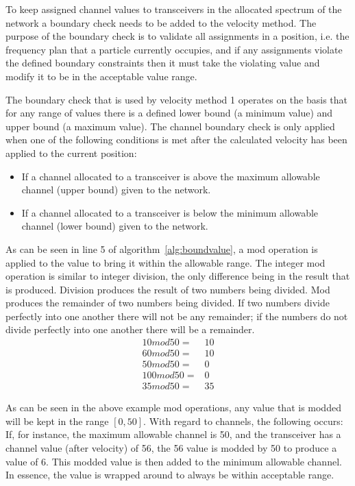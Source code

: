 To keep assigned channel values to transceivers in the allocated spectrum of the network a boundary check needs to be added to the velocity method. The purpose of the boundary check is to validate all assignments in a position, i.e. the frequency plan that a particle currently occupies, and if any assignments violate the defined boundary constraints then it must take the violating value and modify it to be in the acceptable value range.

The boundary check that is used by velocity method 1 operates on the basis that for any range of values there is a defined lower bound (a minimum value) and upper bound (a maximum value). The channel boundary check is only applied when one of the following conditions is met after the calculated velocity has been applied to the current position:
\begin{itemize}
\item If a channel allocated to a transceiver is above the maximum allowable channel (upper bound) given to the network. 
\item If a channel allocated to a transceiver is below the minimum allowable channel (lower bound) given to the network.
\end{itemize}

As can be seen in line 5 of algorithm~\ref{alg:boundvalue}, a mod operation is applied to the value to bring it within the allowable range. The integer mod operation is similar to integer division, the only difference being in the result that is produced. Division produces the result of two numbers being divided. Mod produces the remainder of two numbers being divided. If two numbers divide perfectly into one another there will not be any remainder; if the numbers do not divide perfectly into one another there will be a remainder. 
\begin{align}
	10 mod 50 =& 10 \\
	60 mod 50 =& 10 \\
	50 mod 50 =& 0 \\
	100 mod 50 =& 0 \\
	35 mod 50 =& 35 
\end{align}

As can be seen in the above example mod operations, any value that is modded will be kept in the range $[0,50]$. With regard to channels, the following occurs: If, for instance, the maximum allowable channel is 50, and the transceiver has a channel value (after velocity) of 56, the 56 value is modded by 50 to produce a value of 6. This modded value is then added to the minimum allowable channel. In essence, the value is wrapped around to always be within acceptable range. 

